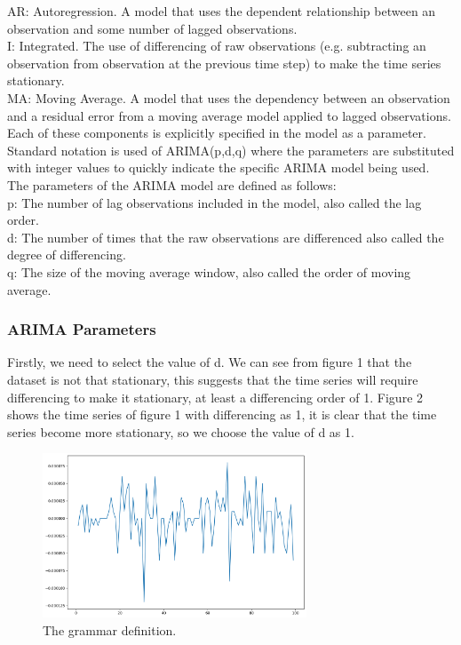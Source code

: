 \documentclass[12pt]{article}
\begin{document}
AR: Autoregression. A model that uses the dependent relationship between an observation and some number of lagged observations.\\

I: Integrated. The use of differencing of raw observations (e.g. subtracting an observation from observation at the previous time step) to make the time series stationary.\\

MA: Moving Average. A model that uses the dependency between an observation and a residual error from a moving average model applied to lagged observations.\\

Each of these components is explicitly specified in the model as a parameter. Standard notation is used of ARIMA(p,d,q) where the parameters are substituted with integer values to quickly indicate the specific ARIMA model being used.\\

The parameters of the ARIMA model are defined as follows:\\

p: The number of lag observations included in the model, also called the lag order.\\

d: The number of times that the raw observations are differenced also called the degree of differencing.\\

q: The size of the moving average window, also called the order of moving average.

\subsubsection{ARIMA Parameters}
Firstly, we need to select the value of d. We can see from figure 1 that the dataset is not that stationary, this suggests that the time series will require differencing to make it stationary, at least a differencing order of 1. Figure 2 shows the time series of figure 1 with differencing as 1, it is clear that the time series become more stationary, so we choose the value of d as 1.

\begin{figure}[H]
\centering 
\includegraphics[width=0.7\textwidth]{fig/section3/m1_400to500_diff1.png}
\centering 
\caption{The grammar definition.}
\label{fig:grammar}
\end{figure}
\end{document}
